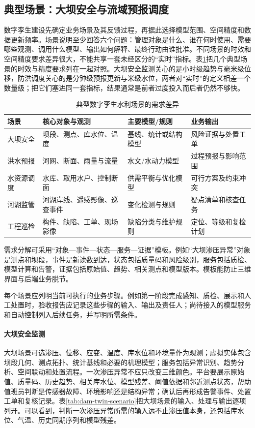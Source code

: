 \subsection{典型场景：大坝安全与流域预报调度}

数字孪生建设先确定业务场景及其反馈过程，再据此选择模型范围、空间精度和数据更新频率。场景说明至少回答六个问题：管理对象是什么、谁在何时使用、需要哪些观测、调用什么模型、输出如何解释、最终行动由谁批准。不同场景的时效和空间精度要求差异很大，不能共享一套未经区分的“实时”指标。表\ref{tab:dt-scenario-requirements}把几个典型场景的时效与精度要求列在一起对照。大坝安全监测关心的是小时级趋势与毫米级位移，防洪调度关心的是分钟级预报更新与米级水位，两者对“实时”的定义相差一个数量级；把它们塞进同一套指标，结果通常是前者过度投入而后者仍然不够快。

\begin{table}[htbp]
\centering
\caption{典型数字孪生水利场景的需求差异}
\label{tab:dt-scenario-requirements}
\begin{tabular}{p{2.6cm}p{3.4cm}p{3.5cm}p{3.5cm}}
\toprule
场景 & 核心对象与观测 & 主要模型/规则 & 业务输出 \\
\midrule
大坝安全 & 坝段、测点、库水位、温度 & 基线、统计或结构模型 & 风险证据与处置工单 \\
洪水预报 & 河网、断面、雨量与流量 & 水文/水动力模型 & 过程预报与影响范围 \\
水资源调度 & 水库、取用水户、控制断面 & 供需平衡与优化模型 & 可行方案及约束冲突 \\
河湖监管 & 河湖岸线、遥感影像、巡查事件 & 变化检测与规则 & 疑点清单和核查任务 \\
工程巡检 & 构件、缺陷、工单、现场影像 & 缺陷分类与维护规则 & 定位、等级和复检计划 \\
\bottomrule
\end{tabular}
\end{table}

需求分解可采用“对象—事件—状态—服务—证据”模板。例如“大坝渗压异常”对象是测点和坝段，事件是新读数到达，状态包括质量码和风险级别，服务包括质检、模型计算和告警，证据包括原始值、趋势、相关测点和模型版本。模板能防止三维界面与后端业务脱节。

每个场景应列明当前可执行的业务步骤。例如第一阶段完成感知、质检、展示和人工处置时，验收报告应记录这些步骤的输入、输出及责任人；尚待接入的模型服务和自动控制列入后续任务，并写明所需条件。

\paragraph{大坝安全监测}大坝场景可选渗压、位移、应变、温度、库水位和环境量作为观测；虚拟实体包含坝段几何、测点拓扑、统计基线和必要的机理模型；服务包括异常识别、趋势分析、空间联动和处置流程。一次渗压异常不应只改变三维颜色。平台要展示原始值、质量码、历史趋势、相关库水位、模型残差、阈值依据和邻近测点状态，帮助值班员判断是传感器故障、环境影响还是结构异常；确认后再形成告警事件、处置工单和复核记录。表\ref{tab:dam-twin-scenario}把大坝场景的输入、处理与输出逐项列开。可以看到，判断一次渗压异常所需的输入远不止渗压值本身，还包括库水位、气温、历史同期序列和模型残差。

